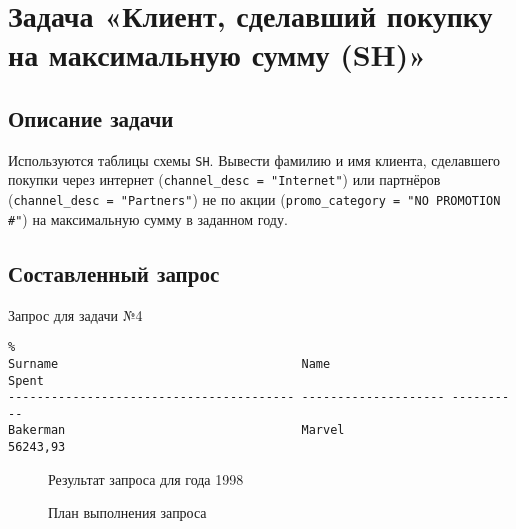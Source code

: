 \chapter{Задача «Клиент, сделавший покупку на максимальную сумму (SH)»}


\section{Описание задачи}


Используются таблицы схемы \texttt{SH}. Вывести фамилию и имя клиента, сделавшего покупки через интернет (\texttt{channel\_desc = "Internet"}) или партнёров (\texttt{channel\_desc = "Partners"}) не по акции (\texttt{promo\_category = "NO PROMOTION \#"}) на максимальную сумму в заданном году.


\section{Составленный запрос}



\begin{algorithm}[H]
  \caption{Запрос для задачи №4}
  \label{code-task-4}
\end{algorithm}

\begin{verbatim}%
Surname                                  Name                      Spent
---------------------------------------- -------------------- ----------
Bakerman                                 Marvel                 56243,93
\end{verbatim}

\begin{figure}[H]%
  \caption{Результат запроса для года 1998}
  \label{fig-task-4-output}
\end{figure}


\begin{figure}[H]%
  \caption{План выполнения запроса}
  \label{fig-task-4-plan}
\end{figure}


